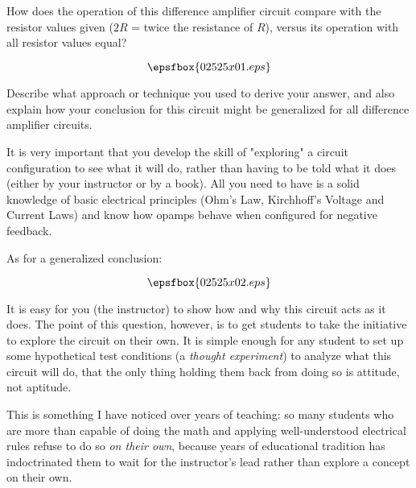 

How does the operation of this difference amplifier circuit compare with the resistor values given ($2R$ = twice the resistance of $R$), versus its operation with all resistor values equal?

$$\epsfbox{02525x01.eps}$$

Describe what approach or technique you used to derive your answer, and also explain how your conclusion for this circuit might be generalized for all difference amplifier circuits.







It is very important that you develop the skill of "exploring" a circuit configuration to see what it will do, rather than having to be told what it does (either by your instructor or by a book).  All you need to have is a solid knowledge of basic electrical principles (Ohm's Law, Kirchhoff's Voltage and Current Laws) and know how opamps behave when configured for negative feedback.

\vskip 10pt

As for a generalized conclusion:

$$\epsfbox{02525x02.eps}$$







It is easy for you (the instructor) to show how and why this circuit acts as it does.  The point of this question, however, is to get students to take the initiative to explore the circuit on their own.  It is simple enough for any student to set up some hypothetical test conditions (a {\it thought experiment}) to analyze what this circuit will do, that the only thing holding them back from doing so is attitude, not aptitude.  

This is something I have noticed over years of teaching: so many students who are more than capable of doing the math and applying well-understood electrical rules refuse to do so {\it on their own}, because years of educational tradition has indoctrinated them to wait for the instructor's lead rather than explore a concept on their own.




